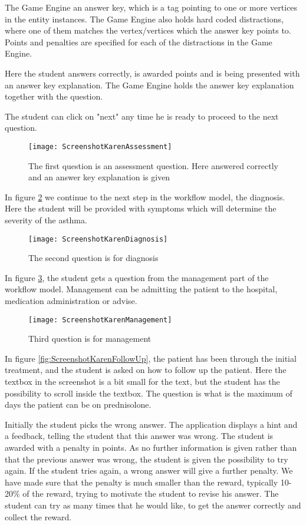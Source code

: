 The Game Engine an answer key, which is a tag pointing to one or more vertices in the entity instances. The Game Engine also holds hard coded distractions, where one of them matches the vertex/vertices which the answer key points to. Points and penalties are specified for each of the distractions in the Game Engine.

Here the student answers correctly, is awarded points and is being presented with an answer key explanation. The Game Engine holds the answer key explanation together with the question. 

The student can click on "next" any time he is ready to proceed to the next question.

\begin{figure}[h!]
	\label{fig:ScreenshotKarenAssessment}
	\texttt{[image: ScreenshotKarenAssessment]}
	\caption {The first question is an assessment question. Here answered correctly and an answer key explanation is given}
\end{figure}

In figure \ref{fig:ScreenshotKarenDiagnosis} we continue to the next step in the workflow model, the diagnosis. Here the student will be provided with symptoms which will determine the severity of the asthma.

\begin{figure}[h!]
	\label{fig:ScreenshotKarenDiagnosis}
	\texttt{[image: ScreenshotKarenDiagnosis]}
		\caption {The second question is for diagnosis}
\end{figure}

In figure \ref{fig:ScreenshotKarenManagement}, the student gets a question from the management part of the workflow model. Management can be admitting the patient to the hospital, medication administration or advise.
\begin{figure}[h!]
	\label{fig:ScreenshotKarenManagement}
	\texttt{[image: ScreenshotKarenManagement]}
	\caption {Third question is for management}
\end{figure}

In figure \ref{fig:ScreenshotKarenFollowUp}, the patient has been through the initial treatment, and the student is asked on how to follow up the patient. Here the textbox in the screenshot is a bit small for the text, but the student has the possibility to scroll inside the textbox. The question is what is the maximum of days the patient can be on prednisolone.

Initially the student picks the wrong answer. The application displays a hint and a feedback, telling the student that this answer was wrong. The student is awarded with a penalty in points. As no further information is given rather than that the previous answer was wrong, the student is given the possibility to try again. If the student tries again, a wrong answer will give a further penalty. We have made sure that the penalty is much smaller than the reward, typically 10-20\% of the reward, trying to motivate the student to revise his answer. The student can try as many times that he would like, to get the answer correctly and collect the reward.

